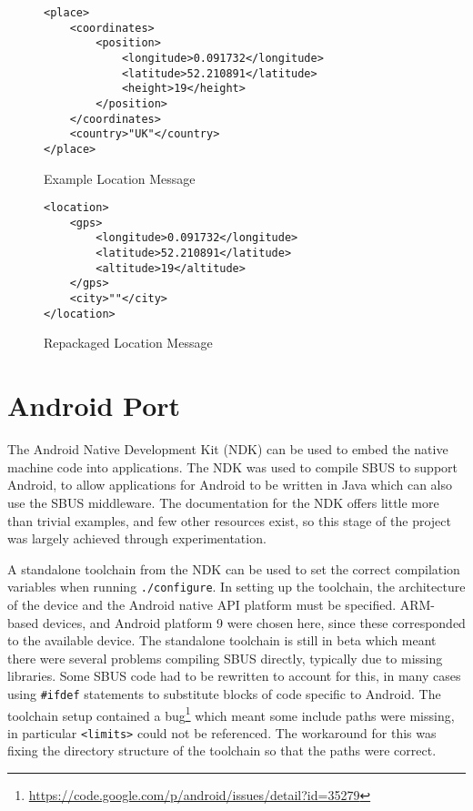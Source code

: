 \documentclass[12pt,twoside,notitlepage]{report}
\begin{document}
\begin{figure}
\begin{lstlisting}[style=xml]
<place>
	<coordinates>
		<position>
			<longitude>0.091732</longitude>
			<latitude>52.210891</latitude>
			<height>19</height>
		</position>
	</coordinates>
	<country>"UK"</country>
</place>
\end{lstlisting}
\caption{Example Location Message}
\label{fig:locationmessage}
\end{figure}

\begin{figure}
\begin{lstlisting}[style=xml]
<location>
	<gps>
		<longitude>0.091732</longitude>
		<latitude>52.210891</latitude>
		<altitude>19</altitude>
	</gps>
	<city>""</city>
</location>
\end{lstlisting}
\caption{Repackaged Location Message}
\label{fig:locationmessagerepack}
\end{figure}

\section{Android Port}

The Android Native Development Kit (NDK) can be used to embed the native machine code into applications. 
The NDK was used to compile SBUS to support Android, to allow applications for Android to be written in Java which can also use the SBUS middleware. 
The documentation for the NDK offers little more than trivial examples, and few other resources exist, so this stage of the project was largely achieved through experimentation. 

A standalone toolchain from the NDK can be used to set the correct compilation variables when running {\tt ./configure}. 
In setting up the toolchain, the architecture of the device and the Android native API platform must be specified. 
ARM-based devices, and Android platform 9 were chosen here, since these corresponded to the available device. 
The standalone toolchain is still in beta which meant there were several problems compiling SBUS directly, typically due to missing libraries. 
Some SBUS code had to be rewritten to account for this, in many cases using {\tt \#ifdef} statements to substitute blocks of code specific to Android. 
The toolchain setup contained a bug\footnote{\url{https://code.google.com/p/android/issues/detail?id=35279}} which meant some include paths were missing, in particular {\tt <limits>} could not be referenced. 
The workaround for this was fixing the directory structure of the toolchain so that the paths were correct. 
\end{document}
